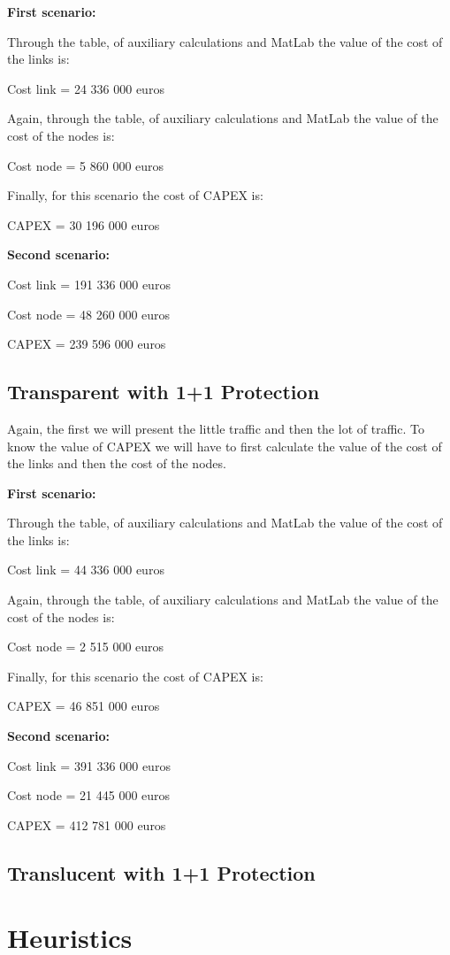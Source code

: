 \textbf{First scenario:}

Through the table, of auxiliary calculations and MatLab the value of the cost of the links is:

Cost link = 24 336 000 euros

Again, through the table, of auxiliary calculations and MatLab the value of the cost of the nodes is:

Cost node = 5 860 000 euros

Finally, for this scenario the cost of CAPEX is:

CAPEX = 30 196 000 euros

\textbf{Second scenario:}

Cost link = 191 336 000 euros

Cost node = 48 260 000 euros

CAPEX = 239 596 000 euros

\subsection{Transparent with 1+1 Protection}
Again, the first we will present the little traffic and then the lot of traffic.
To know the value of CAPEX we will have to first calculate the value of the cost of the links and then the cost of the nodes.

\textbf{First scenario:}

Through the table, of auxiliary calculations and MatLab the value of the cost of the links is:

Cost link = 44 336 000 euros

Again, through the table, of auxiliary calculations and MatLab the value of the cost of the nodes is:

Cost node = 2 515 000 euros

Finally, for this scenario the cost of CAPEX is:

CAPEX = 46 851 000 euros

\textbf{Second scenario:}

Cost link = 391 336 000 euros

Cost node = 21 445 000 euros

CAPEX = 412 781 000 euros

\subsection{Translucent with 1+1 Protection}

\section{Heuristics}

